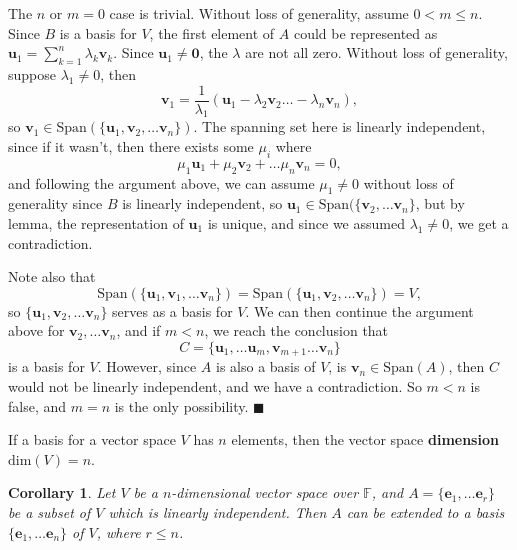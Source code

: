 \documentclass[letter-paper]{tufte-book}
\newtheorem{corollary}[theorem]{\color{pastel-blue}Corollary}
\newenvironment{proof}[1][Proof]{\begin{trivlist}
\item[\hskip \labelsep {\bfseries #1}]}{\end{trivlist}}
\newcommand{\Ob}{{\boldsymbol{0}}}
\newcommand{\eb}{{\boldsymbol{e}}}
\newcommand{\ub}{{\boldsymbol{u}}}
\newcommand{\vb}{{\boldsymbol{v}}}
\newcommand{\qed}{\hfill$\blacksquare$}
\begin{document}
\begin{proof}
  The $n$ or $m=0$ case is trivial. Without loss of generality, assume $0 < m \leq n$. Since $B$ is a basis for $V$, the first element of $A$ could be represented as $\ub_1 = \sum_{k=1}^n \lambda_k \vb_k$. Since $\ub_1 \neq \Ob$, the $\lambda$ are not all zero. Without loss of generality, suppose $\lambda_1 \neq 0$, then
  \begin{equation*}
    \vb_1 = \frac{1}{\lambda_1}(\ub_1 - \lambda_2\vb_2 \ldots - \lambda_n \vb_n),
  \end{equation*}
  so $\vb_1 \in \mbox{Span}(\{\ub_1, \vb_2, \ldots \vb_n\})$. The spanning set here is linearly independent, since if it wasn't, then there exists some $\mu_i$ where
  \begin{equation*}
    \mu_1 \ub_1 + \mu_2 \vb_2 + \ldots \mu_n \vb_n = 0,
  \end{equation*}
  and following the argument above, we can assume $\mu_1 \neq 0$ without loss of generality since $B$ is linearly independent, so $\ub_1 \in \mbox{Span}(\{\vb_2, \ldots \vb_n \}$, but by lemma, the representation of $\ub_1$ is unique, and since we assumed $\lambda_1 \neq 0$, we get a contradiction. 
  
  Note also that
  \begin{equation*}
    \mbox{Span}(\{\ub_1, \vb_1, \ldots \vb_n\}) = \mbox{Span}(\{\ub_1, \vb_2, \ldots \vb_n\}) = V,
  \end{equation*}
  so $\{\ub_1, \vb_2, \ldots \vb_n\}$ serves as a basis for $V$. We can then continue the argument above for $\vb_2, \ldots \vb_n$, and if $m<n$, we reach the conclusion that
  \begin{equation*}
    C = \{\ub_1, \ldots \ub_m, \vb_{m+1} \ldots \vb_n\}
  \end{equation*}
  is a basis for $V$. However, since $A$ is also a basis of $V$, is $\vb_n \in \mbox{Span}(A)$, then $C$ would not be linearly independent, and we have a contradiction. So $m<n$ is false, and $m=n$ is the only possibility. \qed
\end{proof}

If a basis for a vector space $V$ has $n$ elements, then the vector space \textbf{dimension} $\mbox{dim}(V) = n$.

\begin{corollary}\label{cor:extend}
  Let $V$ be a $n$-dimensional vector space over $\mathbb{F}$, and $A = \{\eb_1, \ldots \eb_r\}$ be a subset of $V$ which is linearly independent. Then $A$ can be extended to a basis $\{\eb_1, \ldots \eb_n\}$ of $V$, where $r \leq n$.
\end{corollary}
\end{document}
